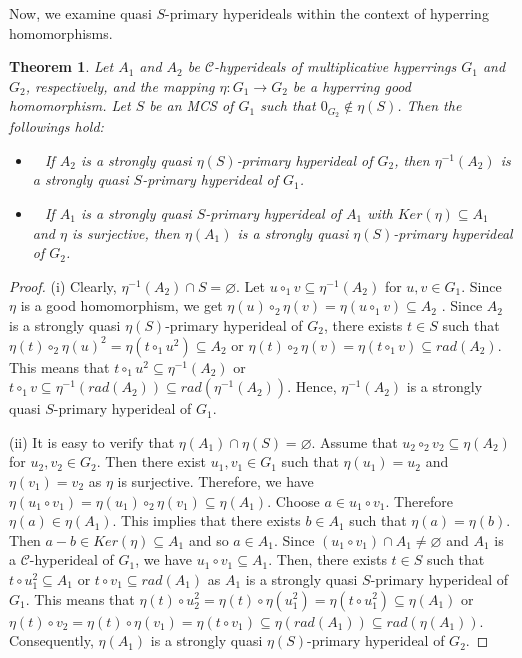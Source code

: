 \documentclass[preprint,review,10pt]{amsart}
\newtheorem{theorem}{Theorem}[section]
\theoremstyle{definition}
\theoremstyle{remark}
\numberwithin{equation}{section}
\begin{document}
Now, we examine quasi $S$-primary hyperideals
within the context of hyperring homomorphisms.
 \begin{theorem} \label{homo2} 
Let   $A_1$ and $A_2$ be $\mathcal{C}$-hyperideals of multiplicative hyperrings $G_1$ and $G_2$, respectively,  and the mapping $\eta: G_1\longrightarrow G_2$  be a hyperring
good homomorphism. Let $S$ be an MCS of $G_1$ such that $0_{G_2} \notin \eta(S)$. Then the followings hold:
\begin{itemize}
\item[\rm{(i)}]~ If $A_2$ is a  strongly quasi $\eta(S)$-primary  hyperideal of $G_2$, then $\eta^{-1}(A_2)$ is a strongly quasi $S$-primary  hyperideal  of $G_1$.
\item[\rm{(ii)}]~ If  $A_1$ is a strongly quasi $S$-primary  hyperideal of $A_1$ with $Ker (\eta) \subseteq A_1$ and $\eta$ is surjective, then $\eta(A_1)$ is a strongly quasi $\eta(S)$-primary  hyperideal of $G_2$.
\end{itemize}
\end{theorem}
\begin{proof}
(i) Clearly, $\eta^{-1}(A_2) \cap S = \varnothing$. Let $u \circ_1 v \subseteq \eta^{-1}(A_2)$ for $u,v \in G_1$. Since $\eta$ is a good homomorphism, we get $\eta(u) \circ_2 \eta(v)=\eta(u \circ _1 v) \subseteq A_2$   . Since $A_2$ is a  strongly quasi $\eta(S)$-primary  hyperideal of $G_2$, there exists $t \in S$ such that $\eta(t) \circ_2 \eta(u)^2=\eta(t \circ_1 u^2 ) \subseteq A_2$  or $\eta(t) \circ_2 \eta(v)=\eta(t \circ_1 v ) \subseteq rad(A_2)$. This means that $t \circ_1 u^2 \subseteq \eta^{-1}(A_2)  $ or $t \circ_1 v \subseteq \eta^{-1}(rad(A_2))  \subseteq rad(\eta^{-1}(A_2))$. Hence, $\eta^{-1}(A_2)$ is a strongly quasi $S$-primary  hyperideal  of $G_1$.

(ii) It is easy to verify that $\eta(A_1) \cap \eta(S)=\varnothing$. Assume that  $u_2 \circ_2 v_2 \subseteq \eta(A_2)$ for $u_2, v_2 \in G_2$. Then there exist $u_1, v_1 \in G_1$ such that $\eta(u_1)=u_2$ and $\eta(v_1)=v_2$ as $\eta$ is surjective. Therefore, we have $\eta(u_1 \circ v_1)=\eta(u_1) \circ_2 \eta(v_1) \subseteq \eta(A_1)$. Choose $a \in u_1 \circ v_1$. Therefore $\eta(a) \in \eta(A_1)$. This implies that there exists $b \in A_1$ such that $\eta(a)=\eta(b)$. Then  $a - b \in Ker (\eta) \subseteq A_1$ and so $a \in A_1$. Since $(u_1 \circ v_1) \cap A_1 \neq \varnothing$ and $A_1$ is a $\mathcal{C}$-hyperideal of $G_1$, we have $u_1 \circ v_1 \subseteq A_1$. Then, there exists $t \in S$ such that $t \circ u_1^2 \subseteq  A_1 $ or $t \circ v_1 \subseteq rad(A_1)$ as $A_1$ is a strongly quasi $S$-primary  hyperideal of $G_1$. This means that $\eta(t) \circ u_2^2= \eta(t) \circ \eta(u_1^2)= \eta(t \circ u_1^2) \subseteq \eta (A_1)$ or $ \eta(t) \circ v_2=\eta(t) \circ \eta(v_1)=\eta(t \circ v_1) \subseteq \eta(rad(A_1))\subseteq rad(\eta(A_1))$.  Consequently, $\eta(A_1)$ is a strongly quasi $\eta(S)$-primary  hyperideal of $G_2$.
\end{proof}
\end{document}
